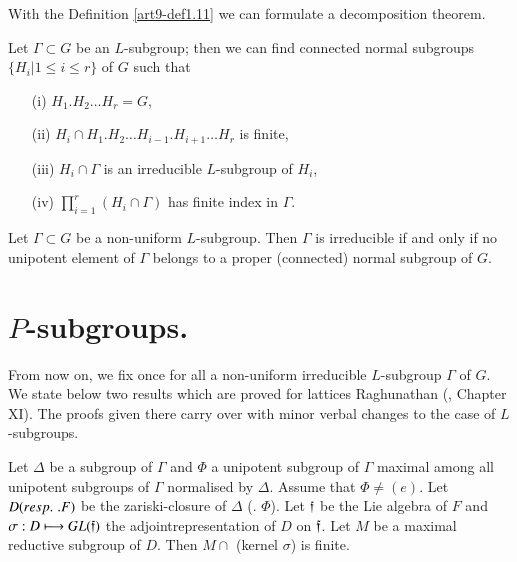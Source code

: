 With the Definition \ref{art9-def1.11} we can formulate a decomposition theorem.

\begin{coro}\label{art9-coro1.13}
Let $\Gamma \subset G$ be an $L$-subgroup; then we can find connected normal subgroups $\{H_i \big| 1 \leqslant i \leqslant r\}$ of $G$ such that 
\begin{itemize}
\item[(i)] $H_1 . H_2 \ldots H_r = G$,

\item[(ii)] $H_i \cap H_1 . H_2 \ldots H_{i-1}. H_{i+1} \ldots H_r$ is finite,

\item[(iii)] $H_i \cap \Gamma$ is an irreducible $L$-subgroup of $H_i$,

\item[(iv)] $\prod\limits^{r}_{i=1} (H_i \cap \Gamma)$ has finite index in $\Gamma$. 
\end{itemize}
\end{coro}

\begin{coro}\label{art9-coro1.14}
Let $\Gamma \subset G$ be a non-uniform $L$-subgroup. Then $\Gamma$ is irreducible if and only if no unipotent element of $\Gamma$ belongs to a proper (connected) normal subgroup of $G$.
\end{coro}

\section{$P$-subgroups.}\label{art9-sec2}
From now on, we fix once for all a non-uniform irreducible $L$-subgroup $\Gamma$ of $G$. We state below two results which are proved for lattices Raghunathan (\cite{art9-key1}, Chapter XI). The proofs given there carry over with minor verbal changes to the case of $L$-subgroups.


\begin{theorem}\label{art9-thm2.1}
Let $\Delta$ be a subgroup of $\Gamma$ and $\Phi$ a unipotent subgroup of $\Gamma$ maximal among all unipotent subgroups of $\Gamma$ normalised by $\Delta$. Assume that $\Phi \neq (e)$. Let $D({resp.}\kern.3em. F)$ be the zariski-closure of $\Delta$ (\resp. $\Phi$). Let $\mathfrak{f}$ be the Lie algebra of $F$ and $\sigma : D \longmapsto G L(\mathfrak{f})$ the adjoint\pageoriginale representation of $D$ on $\mathfrak{f}$. Let $M$ be a maximal reductive subgroup of $D$. Then $M \cap$ (kernel $\sigma$) is finite.
\end{theorem}

